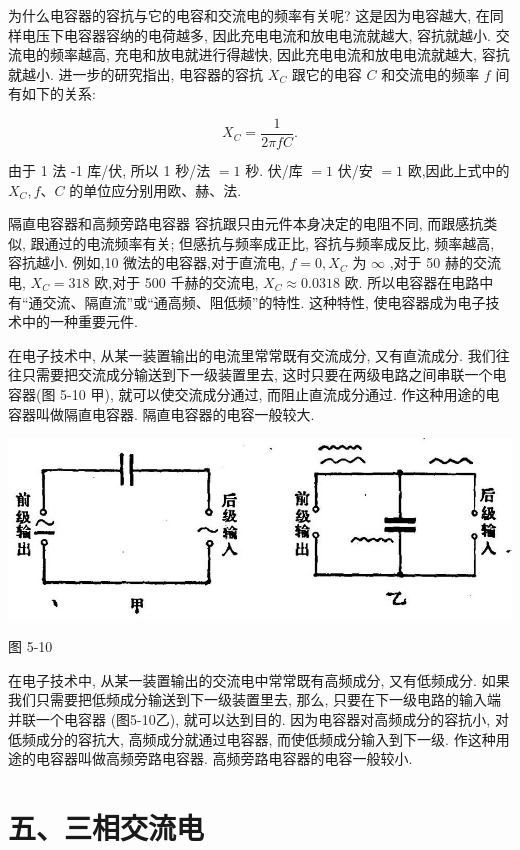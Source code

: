 \documentclass[10pt]{article}
\begin{document}
为什么电容器的容抗与它的电容和交流电的频率有关呢? 这是因为电容越大, 在同样电压下电容器容纳的电荷越多, 因此充电电流和放电电流就越大, 容抗就越小. 交流电的频率越高, 充电和放电就进行得越快, 因此充电电流和放电电流就越大, 容抗就越小. 进一步的研究指出, 电容器的容抗 \({X}_{C}\) 跟它的电容 \(C\) 和交流电的频率 \(f\) 间有如下的关系:

\[
{X}_{C} = \frac{1}{2\pi fC}.
\]

由于 1 法 -1 库/伏, 所以 1 秒/法 \(= 1\) 秒. 伏/库 \(= 1\) 伏/安 \(= 1\) 欧,因此上式中的 \({X}_{C},f\text{、}C\) 的单位应分别用欧、赫、法.

隔直电容器和高频旁路电容器 容抗跟只由元件本身决定的电阻不同, 而跟感抗类似, 跟通过的电流频率有关; 但感抗与频率成正比, 容抗与频率成反比, 频率越高, 容抗越小. 例如,10 微法的电容器,对于直流电, \(f = 0,{X}_{C}\) 为 \(\infty\) ,对于 50 赫的交流电, \({X}_{C} = {318}\) 欧,对于 500 千赫的交流电, \({X}_{C} \approx {0.0318}\) 欧. 所以电容器在电路中有“通交流、隔直流”或“通高频、阻低频”的特性. 这种特性, 使电容器成为电子技术中的一种重要元件.

在电子技术中, 从某一装置输出的电流里常常既有交流成分, 又有直流成分. 我们往往只需要把交流成分输送到下一级装置里去, 这时只要在两级电路之间串联一个电容器(图 5-10 甲), 就可以使交流成分通过, 而阻止直流成分通过. 作这种用途的电容器叫做隔直电容器. 隔直电容器的电容一般较大.

\begin{center}
\includegraphics[max width=1.0\textwidth]{images/01913056-1f15-74d8-9184-9aab52c9d66b_173_551648.jpg}
\end{center}

图 5-10

在电子技术中, 从某一装置输出的交流电中常常既有高频成分, 又有低频成分. 如果我们只需要把低频成分输送到下一级装置里去, 那么, 只要在下一级电路的输入端并联一个电容器 (图5-10乙), 就可以达到目的. 因为电容器对高频成分的容抗小, 对低频成分的容抗大, 高频成分就通过电容器, 而使低频成分输入到下一级. 作这种用途的电容器叫做高频旁路电容器. 高频旁路电容器的电容一般较小.

\section*{五、三相交流电}
\end{document}
